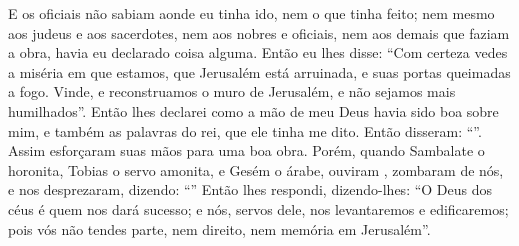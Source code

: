 {{  E os oficiais não sabiam aonde eu tinha ido, nem o que tinha feito; nem mesmo aos judeus e aos sacerdotes, nem aos nobres e oficiais, nem aos demais que faziam a obra, havia eu declarado coisa alguma.
  Então eu lhes disse: \enquote{Com certeza vedes a miséria em que estamos, que Jerusalém está arruinada, e suas portas queimadas a fogo. Vinde, e reconstruamos o muro de Jerusalém, e não sejamos mais humilhados}.
  Então lhes declarei como a mão de meu Deus havia sido boa sobre mim, e também as palavras do rei, que ele tinha me dito. Então disseram: \enquote{}. Assim esforçaram suas mãos para uma boa obra.
  Porém, quando Sambalate o horonita, Tobias o servo amonita, e Gesém o árabe, ouviram {}, zombaram de nós, e nos desprezaram, dizendo: \enquote{}
  Então lhes respondi, dizendo-lhes: \enquote{O Deus dos céus é quem nos dará sucesso; e nós, servos dele, nos levantaremos e edificaremos; pois vós não tendes parte, nem direito, nem memória em Jerusalém}}.
\par }

